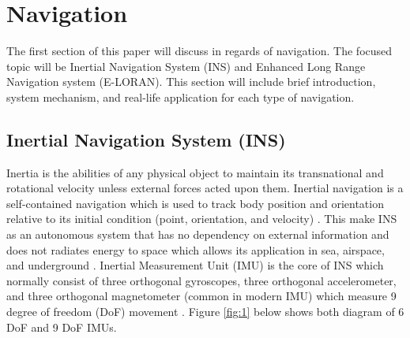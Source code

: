 \newpage
\setcounter{page}{1}
\justifying
\noindent

\section{Navigation}
The first section of this paper will discuss in regards of navigation. The focused topic will be Inertial Navigation System (INS) and Enhanced Long Range Navigation system (E-LORAN). This section will include brief introduction, system mechanism, and real-life application for each type of navigation.

\subsection{Inertial Navigation System (INS)}
Inertia is the abilities of any physical object to maintain its transnational and rotational velocity unless external forces acted upon them. Inertial navigation  is a self-contained navigation which is used to track body position and orientation relative to its initial condition (point, orientation, and velocity) \cite{Woodman2007NumberNavigation}\cite{Ribbens2003AircraftInstruments}. This make INS as an autonomous system that  has no dependency on external information and does not radiates energy to space which allows its application in sea, airspace, and underground \cite{2018MiniatureUnit}. Inertial Measurement Unit (IMU) is the core of INS which normally consist of three orthogonal gyroscopes, three orthogonal accelerometer, and three orthogonal magnetometer (common in modern IMU) which measure 9 degree of freedom (DoF) movement \cite{Christ2014NavigationalSensors}. Figure \ref{fig:1} below shows both diagram of 6 DoF and 9 DoF IMUs.


